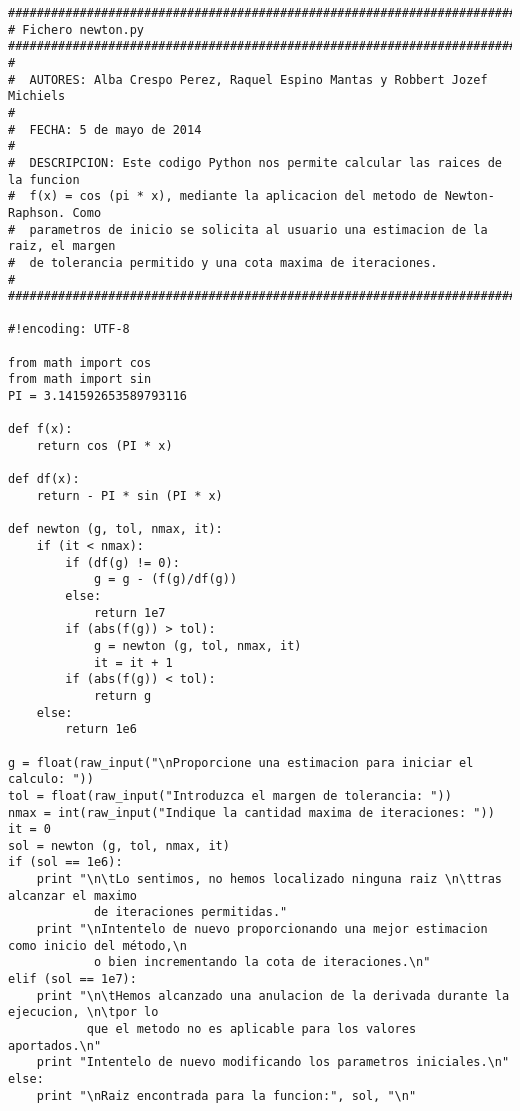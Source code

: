 
\begin{center}
\begin{footnotesize}

\begin{verbatim}
#######################################################################################
# Fichero newton.py
#######################################################################################
#
#  AUTORES: Alba Crespo Perez, Raquel Espino Mantas y Robbert Jozef Michiels
#   
#  FECHA: 5 de mayo de 2014
#
#  DESCRIPCION: Este codigo Python nos permite calcular las raices de la funcion
#  f(x) = cos (pi * x), mediante la aplicacion del metodo de Newton-Raphson. Como
#  parametros de inicio se solicita al usuario una estimacion de la raiz, el margen
#  de tolerancia permitido y una cota maxima de iteraciones.
#
#######################################################################################

#!encoding: UTF-8

from math import cos
from math import sin
PI = 3.141592653589793116

def f(x):
    return cos (PI * x)

def df(x):
    return - PI * sin (PI * x)

def newton (g, tol, nmax, it):
    if (it < nmax):
        if (df(g) != 0):
            g = g - (f(g)/df(g))
        else:
            return 1e7
        if (abs(f(g)) > tol):
            g = newton (g, tol, nmax, it)
            it = it + 1
        if (abs(f(g)) < tol):
            return g
    else:
        return 1e6

g = float(raw_input("\nProporcione una estimacion para iniciar el calculo: "))
tol = float(raw_input("Introduzca el margen de tolerancia: "))
nmax = int(raw_input("Indique la cantidad maxima de iteraciones: "))
it = 0
sol = newton (g, tol, nmax, it)
if (sol == 1e6):
    print "\n\tLo sentimos, no hemos localizado ninguna raiz \n\ttras alcanzar el maximo
            de iteraciones permitidas."
    print "\nIntentelo de nuevo proporcionando una mejor estimacion como inicio del método,\n
            o bien incrementando la cota de iteraciones.\n"
elif (sol == 1e7):
    print "\n\tHemos alcanzado una anulacion de la derivada durante la ejecucion, \n\tpor lo 
           que el metodo no es aplicable para los valores aportados.\n"
    print "Intentelo de nuevo modificando los parametros iniciales.\n"
else:
    print "\nRaiz encontrada para la funcion:", sol, "\n"

\end{verbatim}

\end{footnotesize}
\end{center}

